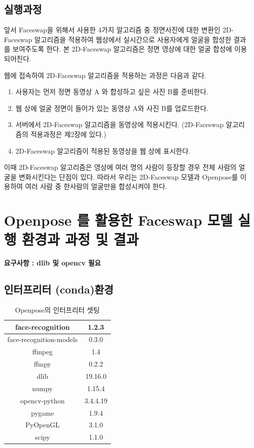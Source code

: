 \documentclass{oblivoir}
\begin{document}
\subsection{실행과정} 

앞서 Faceswap을 위해서 사용한 4가지 알고리즘 중 정면사진에 대한 변환인 2D-Faceswap 알고리즘을 적용하여 웹상에서 실시간으로 사용자에게 얼굴을 합성한 결과를 보여주도록 한다. 본 2D-Faceswap 알고리즘은 정면 영상에 대한 얼굴 합성에 이용되어진다. 

웹에 접속하여 2D-Faceswap 알고리즘을 적용하는 과정은 다음과 같다. 
\begin{enumerate}
    \item  사용자는 먼저 정면 동영상 A 와 합성하고 싶은 사진 B를 준비한다.
    \item 웹 상에 얼굴 정면이 들어가 있는 동영상 A와 사진 B를 업로드한다.
    \item 서버에서 2D-Faceswap 알고리즘을 동영상에 적용시킨다. (2D-Faceswap 알고리즘의 적용과정은 제2장에 있다.)
    \item 2D-Faceswap 알고리즘이 적용된 동영상을 웹 상에 표시한다.
\end{enumerate}

이때 2D-Faceswap 알고리즘은 영상에 여러 명의 사람이 등장할 경우 전체 사람의 얼굴을 변화시킨다는 단점이 있다. 따라서 우리는 2D-Faceswap 모델과 Openpose를 이용하여 여러 사람 중 한사람의 얼굴만을 합성시켜야 한다.



\section{ Openpose 를 활용한 Faceswap 모델 실행 환경과 과정 및 결과}

\textbf{요구사항 :  dlib 및 opencv 필요}

\subsection{인터프리터 (conda)환경}

\begin{table}[h!]
\centering
\begin{tabular}{|c|c|}
    \hline\hline
    face-recognition & 1.2.3\\ \hline
    face-recognition-models & 0.3.0 \\ \hline
    ffmpeg & 1.4 \\ \hline
    ffmpy & 0.2.2 \\ \hline
    dlib & 19.16.0 \\ \hline
    numpy & 1.15.4 \\ \hline
    opencv-python & 3.4.4.19\\ \hline
    pygame & 1.9.4 \\ \hline
    PyOpenGL & 3.1.0 \\ \hline
    scipy &1.1.0\\ \hline
    \hline\hline
\end{tabular}
\caption{Openpose의 인터프리터 셋팅 }
\end{table}
\end{document}

